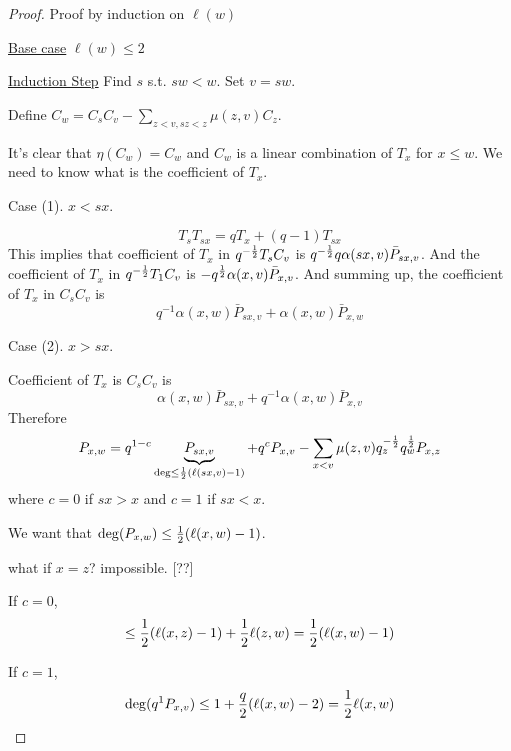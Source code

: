 \begin{proof}
	Proof by induction on $\ell(w)$
	
	\underline{Base case} $\ell(w)\leq 2$
	
	\underline{Induction Step} Find $s$ s.t. $sw<w$. Set $v= sw$.
	
	Define $C_w= C_sC_v-\sum_{z<v,sz<z}\mu(z,v)C_z$.
	
	It's clear that $\eta(C_w)=C_w$ and $C_w $ is a linear combination of $T_x$ for $x\leq w$. We need to know what is the coefficient of $T_x$.
	
	Case (1). $x<sx$.
	
	\[T_s T_{sx} = qT_x+(q-1)T_{sx} \]
	This implies that coefficient of $T_x$ in $q^{-{1\over 2}} T_s C_v$ is $q^{-{1\over 2}}q \alpha(sx,v)\bar P_{sx,v}$.
	And the coefficient of $T_x$ in $q^{-{1\over 2}} T_1 C_v$ is $-q^{1\over 2}\alpha(x,v)\bar P_{x,v}$.
	And summing up, the coefficient of $T_x$ in $C_sC_v$ is
	\[q^{-1}\alpha(x,w)\bar P_{sx,v} + \alpha(x,w)\bar P_{x,w}\]
	
	Case (2). $x>sx$.
	
	Coefficient of $T_x$ is $C_sC_v$ is
	\[\alpha(x,w)\bar P_{sx,v}+q^{-1}\alpha(x,w)\bar P_{x,v}\]
	Therefore
	\[P_{x,w}=q^{1-c}\underbrace{P_{sx,v}}_{\deg\leq {1\over 2}(\ell(sx,v)-1)}+q^cP_{x,v}-\sum_{x<v}\mu(z,v) q_z^{-{1\over 2}}q_w^{1\over 2} P_{x,z}\]
	where $c=0$ if $sx>x$ and $c=1$ if $sx<x$.
	
	We want that $\deg(P_{x,w})\leq {1\over 2}(\ell(x,w)-1)$.
	
	what if $x=z$? impossible. [??]
	
	If $c=0$, 
	\[\leq {1\over 2}(\ell(x,z)-1)+{1\over 2}\ell(z,w)={1\over 2}(\ell(x,w)-1)\]	
	
	If $c=1$,
	\[\deg(q^1 P_{x,v})\leq 1+{q\over 2}(\ell(x,w)-2)={1\over 2}\ell(x,w)\]	
	
\end{proof}